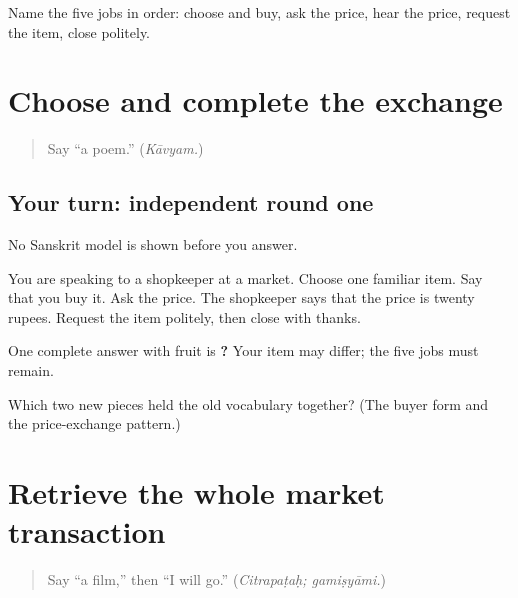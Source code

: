 \begin{tcolorbox}[breakable,colback=teal!4,colframe=teal!35!black,title={Before you move on}]
Name the five jobs in order: choose and buy, ask the price, hear the price, request the item, close politely.
\end{tcolorbox}
\section[Practice]{Choose and complete the exchange}

\label{lesson:SA-C266-mixed-market-practice}



\begin{quote}
Say “a poem.” (\emph{Kāvyam.})
\end{quote}

\subsection*{Your turn: independent round one}
No Sanskrit model is shown before you answer.

You are speaking to a shopkeeper at a market. Choose one familiar item. Say that you buy it. Ask the price. The shopkeeper says that the price is twenty rupees. Request the item politely, then close with thanks.

\begin{grammarlens}[title={What you've built: check after speaking}]
One complete answer with fruit is \textbf{    ?       } Your item may differ; the five jobs must remain.
\end{grammarlens}

\begin{tcolorbox}[breakable,colback=teal!4,colframe=teal!35!black,title={Before you move on}]
Which two new pieces held the old vocabulary together? (The buyer form \textbf{} and the price-exchange pattern.)
\end{tcolorbox}
\section[Practice]{Retrieve the whole market transaction}

\label{lesson:SA-C266-market-transaction-retrieval}



\begin{quote}
Say “a film,” then “I will go.” (\emph{Citrapaṭaḥ; gamiṣyāmi.})
\end{quote}

